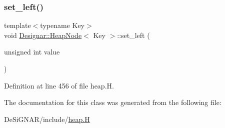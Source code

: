 \subsubsection{\texorpdfstring{set\+\_\+left()}{set\_left()}}
{\footnotesize\ttfamily template$<$typename Key$>$ \\
void \hyperlink{class_designar_1_1_heap_node}{Designar\+::\+Heap\+Node}$<$ Key $>$\+::set\+\_\+left (\begin{DoxyParamCaption}\item[{unsigned int}]{value }\end{DoxyParamCaption})\hspace{0.3cm}{\ttfamily [inline]}}



Definition at line 456 of file heap.\+H.



The documentation for this class was generated from the following file\+:\begin{DoxyCompactItemize}
\item 
De\+Si\+G\+N\+A\+R/include/\hyperlink{heap_8_h}{heap.\+H}\end{DoxyCompactItemize}
